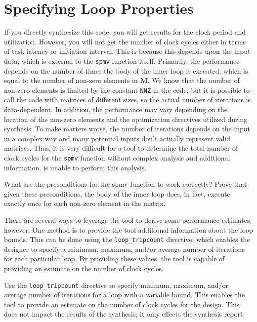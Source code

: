 \section{Specifying Loop Properties}

If you directly synthesize this code, you will get results for the clock period and utilization. However, you will not get the number of clock cycles either in terms of task latency or initiation interval. This is because this depends upon the input data, which is external to the \lstinline{spmv} function itself.  Primarily, the performance depends on the number of times the body of the inner loop is executed, which is equal to the number of non-zero elements in $\mathbf{M}$.  We know that the number of non-zero elements is limited by the constant \lstinline{NNZ} in the code, but it is possible to call the code with matrices of different sizes, so the actual number of iterations is data-dependent. In addition, the performance may vary depending on the location of the non-zero elements and the optimization directives utilized during synthesis. To make matters worse, the number of iterations depends on the input in a complex way and many potential inputs don't actually represent valid matrices. Thus, it is very difficult for a tool to determine the total number of clock cycles for the \lstinline{spmv} function without complex analysis and additional information. \VHLS is unable to perform this analysis.

\begin{exercise}
What are the preconditions for the spmv function to work correctly?  Prove that given these preconditions, the body of the inner loop does, in fact, execute exactly once for each non-zero element in the matrix.
\end{exercise}

There are several ways to leverage the tool to derive some performance estimates, however. One method is to provide the \VHLS tool additional information about the loop bounds. This can be done using the \lstinline{loop_tripcount} directive, which enables the designer to specify a minimum, maximum, and/or average number of iterations for each particular loop. By providing these values, the \VHLS tool is capable of providing an estimate on the number of clock cycles. 

\begin{aside}
Use the \lstinline{loop_tripcount} directive to specify minimum, maximum, and/or average number of iterations for a loop with a variable bound. This enables the \VHLS tool to provide an estimate on the number of clock cycles for the design. This does not impact the results of the synthesis; it only effects the synthesis report.
\end{aside}

